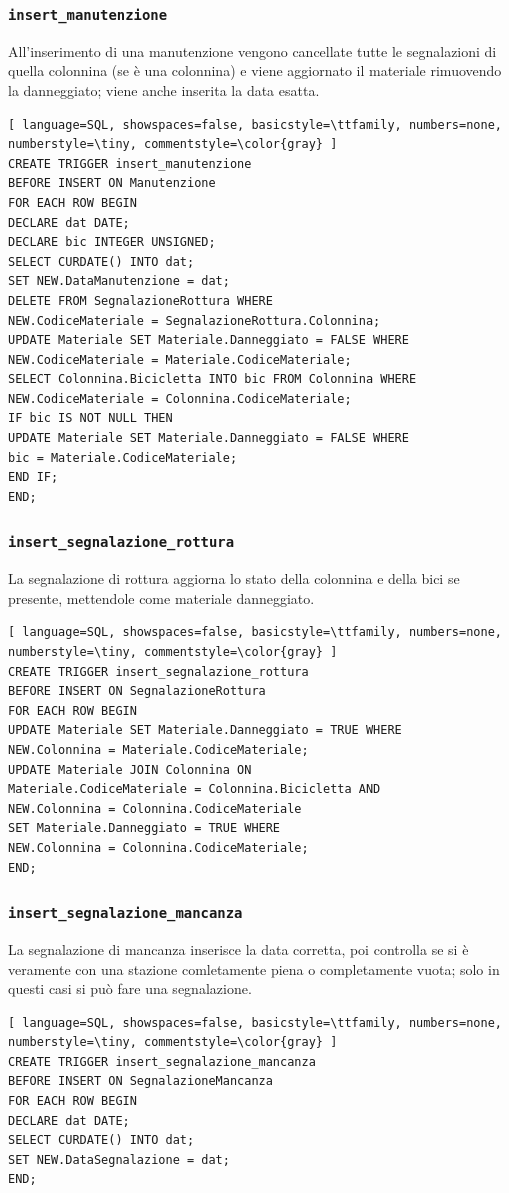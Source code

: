\documentclass[a4paper,twoside]{article}
\begin{document}
\subsubsection{\texttt{insert\_manutenzione}}
All'inserimento di una manutenzione vengono cancellate tutte le segnalazioni di quella colonnina (se è una colonnina) e viene aggiornato il materiale rimuovendo la danneggiato; viene anche inserita la data esatta.
\begin{lstlisting}[ language=SQL, showspaces=false, basicstyle=\ttfamily, numbers=none, numberstyle=\tiny, commentstyle=\color{gray} ]
CREATE TRIGGER insert_manutenzione
BEFORE INSERT ON Manutenzione
FOR EACH ROW BEGIN
DECLARE dat DATE;
DECLARE bic INTEGER UNSIGNED;
SELECT CURDATE() INTO dat;
SET NEW.DataManutenzione = dat;
DELETE FROM SegnalazioneRottura WHERE
NEW.CodiceMateriale = SegnalazioneRottura.Colonnina;
UPDATE Materiale SET Materiale.Danneggiato = FALSE WHERE
NEW.CodiceMateriale = Materiale.CodiceMateriale;
SELECT Colonnina.Bicicletta INTO bic FROM Colonnina WHERE
NEW.CodiceMateriale = Colonnina.CodiceMateriale;
IF bic IS NOT NULL THEN
UPDATE Materiale SET Materiale.Danneggiato = FALSE WHERE
bic = Materiale.CodiceMateriale;
END IF;
END;
\end{lstlisting}
\subsubsection{\texttt{insert\_segnalazione\_rottura}}
La segnalazione di rottura aggiorna lo stato della colonnina e della bici se presente, mettendole come materiale danneggiato.
\begin{lstlisting}[ language=SQL, showspaces=false, basicstyle=\ttfamily, numbers=none, numberstyle=\tiny, commentstyle=\color{gray} ]
CREATE TRIGGER insert_segnalazione_rottura
BEFORE INSERT ON SegnalazioneRottura
FOR EACH ROW BEGIN
UPDATE Materiale SET Materiale.Danneggiato = TRUE WHERE
NEW.Colonnina = Materiale.CodiceMateriale;
UPDATE Materiale JOIN Colonnina ON
Materiale.CodiceMateriale = Colonnina.Bicicletta AND
NEW.Colonnina = Colonnina.CodiceMateriale
SET Materiale.Danneggiato = TRUE WHERE
NEW.Colonnina = Colonnina.CodiceMateriale;
END;
\end{lstlisting}
\subsubsection{\texttt{insert\_segnalazione\_mancanza}}
La segnalazione di mancanza inserisce la data corretta, poi controlla se si è veramente con una stazione comletamente piena o completamente vuota; solo in questi casi si può fare una segnalazione.
\begin{lstlisting}[ language=SQL, showspaces=false, basicstyle=\ttfamily, numbers=none, numberstyle=\tiny, commentstyle=\color{gray} ]
CREATE TRIGGER insert_segnalazione_mancanza
BEFORE INSERT ON SegnalazioneMancanza
FOR EACH ROW BEGIN
DECLARE dat DATE;
SELECT CURDATE() INTO dat;
SET NEW.DataSegnalazione = dat;
END;
\end{lstlisting}
\newpage
\end{document}
